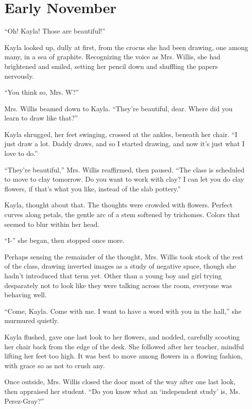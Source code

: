 \chapter{Early November}

``Oh!  Kayla!  Those are beautiful!''

Kayla looked up, dully at first, from the crocus she had been drawing, one among many, in a sea of graphite.  Recognizing the voice as Mrs. Willis, she had brightened and smiled, setting her pencil down and shuffling the papers nervously.

``You think so, Mrs. W?''

Mrs. Willis beamed down to Kayla.  ``They're beautiful, dear.  Where did you learn to draw like that?''

Kayla shrugged, her feet swinging, crossed at the ankles, beneath her chair.  ``I just draw a lot.  Daddy draws, and so I started drawing, and now it's just what I love to do.''

``They're beautiful,'' Mrs. Willis reaffirmed, then paused.  ``The class is scheduled to move to clay tomorrow.  Do you want to work with clay?  I can let you do clay flowers, if that's what you like, instead of the slab pottery.''

Kayla, thought about that.  The thoughts were crowded with flowers.  Perfect curves along petals, the gentle arc of a stem softened by trichomes.  Colors that seemed to blur within her head.

``I-'' she began, then stopped once more.

Perhaps sensing the remainder of the thought, Mrs. Willis took stock of the rest of the class, drawing inverted images as a study of negative space, though she hadn't introduced that term yet.  Other than a young boy and girl trying desparately not to look like they were talking across the room, everyone was behaving well.

``Come, Kayla.  Come with me.  I want to have a word with you in the hall,'' she murmured quietly.

Kayla flushed, gave one last look to her flowers, and nodded, carefully scooting her chair back from the edge of the desk.  She followed after her teacher, mindful lifting her feet too high.  It was best to move among flowers in a flowing fashion, with grace so as not to crush any.

Once outside, Mrs. Willis closed the door most of the way after one last look, then appraised her student.  ``Do you know what an `independent study' is, Ms. Perez-Gray?''

